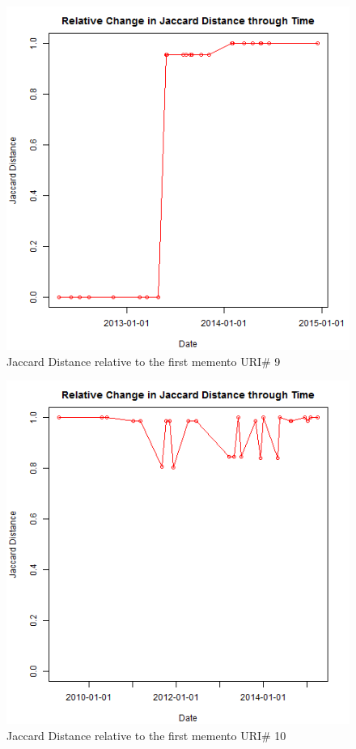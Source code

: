 \clearpage
\begin{figure}[ht]
	\begin{center}
		 \includegraphics[scale=0.60]{url9}
		  \caption{Jaccard Distance relative to the first memento URI\# 9}
	 \end{center}
\end{figure}
\begin{figure}[ht]
	\begin{center}
		 \includegraphics[scale=0.60]{url10}
		  \caption{Jaccard Distance relative to the first memento URI\# 10}
	 \end{center}
\end{figure}
